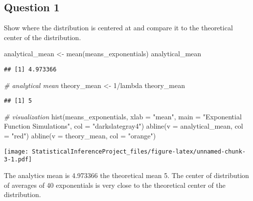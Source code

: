 \documentclass[
]{article}
\newenvironment{Shaded}{\begin{snugshade}}{\end{snugshade}}
\newcommand{\AttributeTok}[1]{\textcolor[rgb]{0.77,0.63,0.00}{#1}}
\newcommand{\CommentTok}[1]{\textcolor[rgb]{0.56,0.35,0.01}{\textit{#1}}}
\newcommand{\DecValTok}[1]{\textcolor[rgb]{0.00,0.00,0.81}{#1}}
\newcommand{\FunctionTok}[1]{\textcolor[rgb]{0.00,0.00,0.00}{#1}}
\newcommand{\NormalTok}[1]{#1}
\newcommand{\OtherTok}[1]{\textcolor[rgb]{0.56,0.35,0.01}{#1}}
\newcommand{\SpecialCharTok}[1]{\textcolor[rgb]{0.00,0.00,0.00}{#1}}
\newcommand{\StringTok}[1]{\textcolor[rgb]{0.31,0.60,0.02}{#1}}
\begin{document}
\hypertarget{question-1}{%
\subsection{Question 1}\label{question-1}}

Show where the distribution is centered at and compare it to the
theoretical center of the distribution.

\begin{Shaded}
\begin{Highlighting}[]
\NormalTok{analytical\_mean }\OtherTok{\textless{}{-}} \FunctionTok{mean}\NormalTok{(means\_exponentials)}
\NormalTok{analytical\_mean}
\end{Highlighting}
\end{Shaded}

\begin{verbatim}
## [1] 4.973366
\end{verbatim}

\begin{Shaded}
\begin{Highlighting}[]
\CommentTok{\# analytical mean}
\NormalTok{theory\_mean }\OtherTok{\textless{}{-}} \DecValTok{1}\SpecialCharTok{/}\NormalTok{lambda}
\NormalTok{theory\_mean}
\end{Highlighting}
\end{Shaded}

\begin{verbatim}
## [1] 5
\end{verbatim}

\begin{Shaded}
\begin{Highlighting}[]
\CommentTok{\# visualization}
\FunctionTok{hist}\NormalTok{(means\_exponentials, }\AttributeTok{xlab =} \StringTok{"mean"}\NormalTok{, }\AttributeTok{main =} \StringTok{"Exponential Function Simulations"}\NormalTok{, }\AttributeTok{col =} \StringTok{"darkslategray4"}\NormalTok{)}
\FunctionTok{abline}\NormalTok{(}\AttributeTok{v =}\NormalTok{ analytical\_mean, }\AttributeTok{col =} \StringTok{"red"}\NormalTok{)}
\FunctionTok{abline}\NormalTok{(}\AttributeTok{v =}\NormalTok{ theory\_mean, }\AttributeTok{col =} \StringTok{"orange"}\NormalTok{)}
\end{Highlighting}
\end{Shaded}

\texttt{[image: StatisticalInferenceProject\_files/figure-latex/unnamed-chunk-3-1.pdf]}

The analytics mean is 4.973366 the theoretical mean 5. The center of
distribution of averages of 40 exponentials is very close to the
theoretical center of the distribution.
\end{document}
